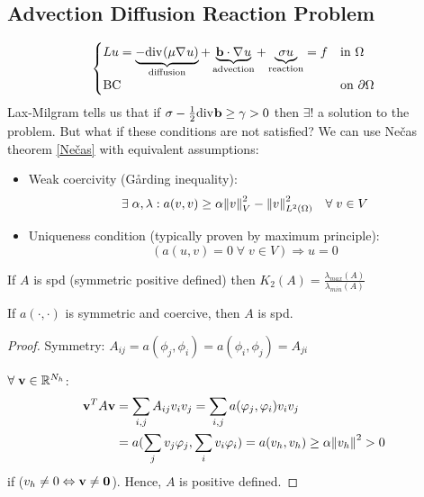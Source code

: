 \subsection{Advection Diffusion Reaction Problem}
\begin{equation*}
   \begin{cases}
       Lu = \underbrace{-\text{div}\mspace{1mu} (\mu\nabla\mspace{1mu} u)}_{\text{diffusion}} + \underbrace{\textbf{b} \cdot \nabla\mspace{1mu} u}_{\text{advection}} + \underbrace{\sigma u}_{\text{reaction}} = f & \text{in }\Omega \\
       \text{BC }& \text{on }\partial\Omega\\
   \end{cases}
\end{equation*}
Lax-Milgram tells us that if \(\sigma - \frac{1}{2}\text{div}\mspace{1mu}\textbf{b} \geq \gamma > 0\) then \(\exists!\) a solution to the problem. But what if these conditions are not satisfied? We can use Nečas theorem \eqref{Nečas} with equivalent assumptions:
\begin{itemize}
    \item Weak coercivity (Gårding inequality): 
    \[
        \exists \; \alpha, \lambda : a(v,v) \geq \alpha \norm{v}_V^2-\norm{v}_{L^2(\Omega)}^2 \quad \forall \; v \in V
    \]
    \item Uniqueness condition (typically proven by maximum principle):
    \[
        (a(u,v) = 0 \; \forall \; v \in V) \Rightarrow u = 0
    \]
\end{itemize}
If \(A\) is spd (symmetric positive defined) then \(K_2(A) = \frac{\lambda_{max}(A)}{\lambda_{min}(A)}\)

    \begin{proposition}
        If \(a(\cdot,\cdot)\) is symmetric and coercive, then \(A\) is spd.
    \end{proposition}

    \begin{proof}
        Symmetry: \(A_{ij} = a(\phi_j,\phi_i) = a(\phi_i,\phi_j) = A_{ji}\)

        \(\forall \; \textbf{v} \in \mathbb{R}^{N_h}\):
        \begin{align*}
            \textbf{v}^TA\textbf{v} & = \sum_{i,j}A_{ij}v_iv_j = \sum_{i,j}a(\varphi_j, \varphi_i)v_i v_j \\
            & = a(\sum_j v_j \varphi_j, \sum_i v_i \varphi_i) = a(v_h, v_h) \geq \alpha\norm{v_h}^2 > 0
        \end{align*}
    if (\(v_h \neq 0 \Leftrightarrow \textbf{v} \neq \textbf{0}\)). Hence, \(A\) is positive defined.
    \end{proof}

